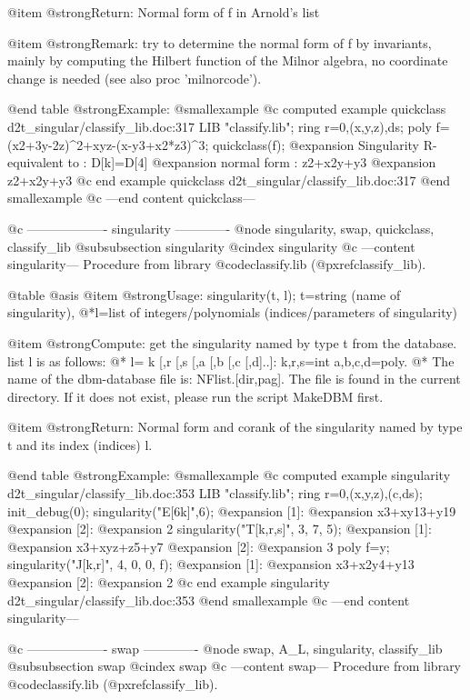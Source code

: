 @item @strong{Return:}
Normal form of f in Arnold's list

@item @strong{Remark:}
try to determine the normal form of f by invariants, mainly by
computing the Hilbert function of the Milnor algebra,
no coordinate change is needed (see also proc 'milnorcode').

@end table
@strong{Example:}
@smallexample
@c computed example quickclass d2t_singular/classify_lib.doc:317 
LIB "classify.lib";
ring r=0,(x,y,z),ds;
poly f=(x2+3y-2z)^2+xyz-(x-y3+x2*z3)^3;
quickclass(f);
@expansion{} Singularity R-equivalent to :  D[k]=D[4]
@expansion{} normal form : z2+x2y+y3
@expansion{} z2+x2y+y3
@c end example quickclass d2t_singular/classify_lib.doc:317
@end smallexample
@c ---end content quickclass---

@c ------------------- singularity -------------
@node singularity, swap, quickclass, classify_lib
@subsubsection singularity
@cindex singularity
@c ---content singularity---
Procedure from library @code{classify.lib} (@pxref{classify_lib}).

@table @asis
@item @strong{Usage:}
singularity(t, l); t=string (name of singularity),
@*l=list of integers/polynomials (indices/parameters of singularity)

@item @strong{Compute:}
get the singularity named by type t from the database.
list l is as follows: @*
l= k [,r [,s [,a [,b [,c [,d]..]: k,r,s=int a,b,c,d=poly. @*
The name of the dbm-database file is: NFlist.[dir,pag].
The file is found in the current directory. If it does not
exist, please run the script MakeDBM first.

@item @strong{Return:}
Normal form and corank of the singularity named by type t and its
index (indices) l.

@end table
@strong{Example:}
@smallexample
@c computed example singularity d2t_singular/classify_lib.doc:353 
LIB "classify.lib";
ring r=0,(x,y,z),(c,ds);
init_debug(0);
singularity("E[6k]",6);
@expansion{} [1]:
@expansion{}    x3+xy13+y19
@expansion{} [2]:
@expansion{}    2
singularity("T[k,r,s]", 3, 7, 5);
@expansion{} [1]:
@expansion{}    x3+xyz+z5+y7
@expansion{} [2]:
@expansion{}    3
poly f=y;
singularity("J[k,r]", 4, 0, 0, f);
@expansion{} [1]:
@expansion{}    x3+x2y4+y13
@expansion{} [2]:
@expansion{}    2
@c end example singularity d2t_singular/classify_lib.doc:353
@end smallexample
@c ---end content singularity---

@c ------------------- swap -------------
@node swap, A_L, singularity, classify_lib
@subsubsection swap
@cindex swap
@c ---content swap---
Procedure from library @code{classify.lib} (@pxref{classify_lib}).

